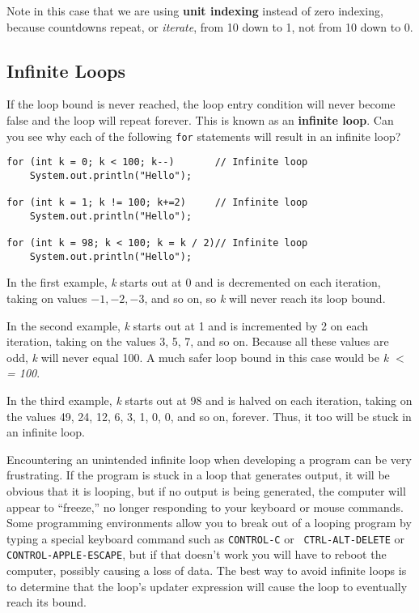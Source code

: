 \noindent Note in this case that we are using {\bf unit indexing}
instead of zero indexing, because countdowns repeat, or {\it iterate},
from 10 down to 1, not from 10 down to 0.

\subsection{Infinite Loops}
\noindent If the loop bound is never reached, the loop entry condition will
never become false and the loop will repeat forever.  This is known as
an {\bf infinite loop}.  Can you see why each of the following
{\tt for} statements will result in an infinite loop?

\begin{jjjlisting}
\begin{lstlisting}
for (int k = 0; k < 100; k--)       // Infinite loop
    System.out.println("Hello");

for (int k = 1; k != 100; k+=2)     // Infinite loop
    System.out.println("Hello");

for (int k = 98; k < 100; k = k / 2)// Infinite loop
    System.out.println("Hello");
\end{lstlisting}
\end{jjjlisting}

\noindent In the first example, {\it k} starts out at 0 and is decremented
on each iteration, taking on values $-1, -2, -3$, and so on, so
{\it k} will never reach its loop bound.

In the second example, {\it k} starts out at 1 and is incremented by 2 on
each iteration, taking on the values 3, 5, 7, and so on.  Because all
these values are odd, {\it k} will never equal 100. A much safer loop
bound in this case would be {\it k $<$= 100}.

In the third example, {\it k} starts out at 98 and is halved on each
iteration, taking on the values 49, 24, 12, 6, 3, 1, 0, 0, and so on,
forever.   Thus, it too will be stuck in an infinite loop.

Encountering an unintended infinite loop when developing a program can
be very frustrating.   If the program is stuck in a loop 
that generates output, it will be obvious that it is looping, but if
no output is being generated, the computer will appear to ``freeze,''
no longer responding to your keyboard or mouse commands.  Some
programming environments allow you to break out of a looping program
by typing a special keyboard command such as {\tt CONTROL-C} or {\tt
CTRL-ALT-DELETE} or {\tt CONTROL-APPLE-ESCAPE}, but if that doesn't
work you will have to reboot the computer, possibly causing a loss of
data.  The best way to avoid infinite loops is to determine that the
loop's updater expression will cause the loop to eventually reach its
bound.

